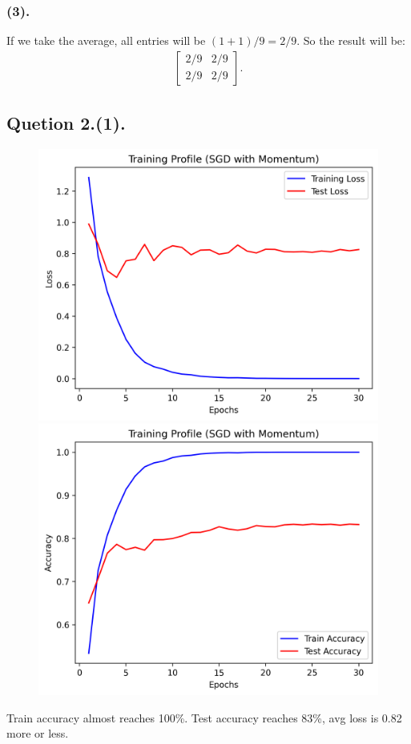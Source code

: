 \documentclass{article}
\begin{document}
\subsubsection*{(3).}
If we take the average, all entries will be $(1+1)/9 = 2/9$.
So the result will be:
\begin{align*}
  \begin{bmatrix}
    2/9&2/9\\
    2/9&2/9
  \end{bmatrix}.
\end{align*}

\newpage
\subsection*{Quetion 2.(1).}
\begin{figure}[htbp]
  \centering
  \includegraphics[scale=0.7]{pic/loss_curve_SGD.png}
  \includegraphics[scale=0.7]{pic/accuracy_curve_SGD.png}
\end{figure}
Train accuracy almost reaches 100\%.
Test accuracy reaches 83\%, avg loss is 0.82 more or less.
\end{document}
